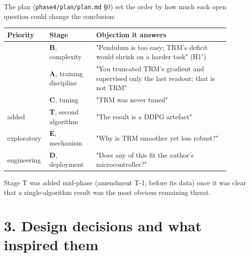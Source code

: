 \documentclass[11pt]{article}
\begin{document}
The plan (\texttt{phase4/\allowbreak{}plan/\allowbreak{}plan.\allowbreak{}md} \S{}0) set the order by how much each open question could change the conclusion:



\begin{center}\small\begin{tabular}{>{\raggedright\arraybackslash}p{0.127\linewidth}>{\raggedright\arraybackslash}p{0.200\linewidth}>{\raggedright\arraybackslash}p{0.579\linewidth}}
\toprule
Priority & Stage & Objection it answers \\
\midrule
1 & \textbf{B}, complexity & "Pendulum is too easy; TRM's deficit would shrink on a harder task" (H1$'$) \\
2 & \textbf{A}, training discipline & "You truncated TRM's gradient and supervised only the last readout; that is not TRM" \\
3 & \textbf{C}, tuning & "TRM was never tuned" \\
added & \textbf{T}, second algorithm & "The result is a DDPG artefact" \\
exploratory & \textbf{E}, mechanism & "Why is TRM smoother yet less robust?" \\
engineering & \textbf{D}, deployment & "Does any of this fit the author's microcontroller?" \\
\bottomrule
\end{tabular}\end{center}



Stage T was added mid-phase (amendment T-1, before its data) once it was clear that a single-algorithm result was the most obvious remaining threat.



\section*{3. Design decisions and what inspired them}
\end{document}
